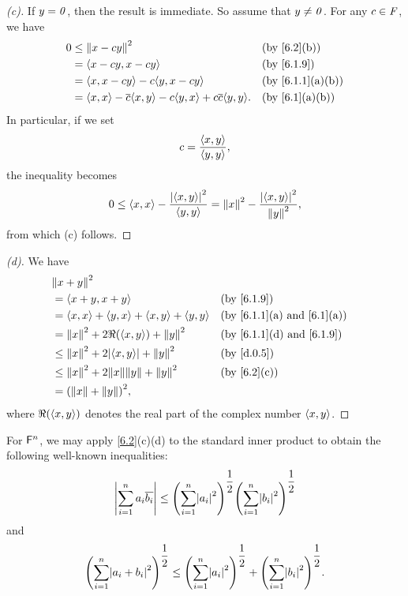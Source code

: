 \begin{proof}[(c)]
  If \(y = \mathit{0}\), then the result is immediate.
  So assume that \(y \neq \mathit{0}\).
  For any \(c \in \mathit{F}\), we have
  \begin{align*}
    0 & \leq \norm{x - cy}^2                                                       &  & \by{6.2}[b]     \\
      & = \inn{x - cy, x - cy}                                                     &  & \by{6.1.9}      \\
      & = \inn{x, x - cy} - c \inn{y, x - cy}                                      &  & \by{6.1.1}[a,b] \\
      & = \inn{x, x} - \conj{c} \inn{x, y} - c \inn{y, x} + c \conj{c} \inn{y, y}. &  & \by{6.1}[a,b]
  \end{align*}
  In particular, if we set
  \[
    c = \dfrac{\left\langle x, y\right\rangle}{\left\langle y, y\right\rangle},
  \]
  the inequality becomes
  \[
    0 \leq \left\langle x, x\right\rangle - \dfrac{\left\lvert\left\langle x, y\right\rangle\right\rvert^2}{\left\langle y, y\right\rangle} = \left\lVert x\right\rVert^2 - \dfrac{\left\lvert\left\langle x, y\right\rangle\right\rvert^2}{\left\lVert y\right\rVert^2},
  \]
  from which (c) follows.
\end{proof}

\begin{proof}[(d)]
  We have
  \begin{align*}
     & \norm{x + y}^2                                                                                         \\
     & = \inn{x + y, x + y}                                &  & \by{6.1.9}                                    \\
     & = \inn{x, x} + \inn{y, x} + \inn{x, y} + \inn{y, y} &  & \text{(by \cref{6.1.1}(a) and \cref{6.1}(a))} \\
     & = \norm{x}^2 + 2 \Re(\inn{x, y}) + \norm{y}^2       &  & \text{(by \cref{6.1.1}(d) and \cref{6.1.9})}  \\
     & \leq \norm{x}^2 + 2 \abs{\inn{x, y}} + \norm{y}^2   &  & \by{d.0.5}                                    \\
     & \leq \norm{x}^2 + 2 \norm{x} \norm{y} + \norm{y}^2  &  & \by{6.2}[c]                                   \\
     & = \pa{\norm{x} + \norm{y}}^2,
  \end{align*}
  where \(\Re(\left\langle x, y\right\rangle)\) denotes the real part of the complex number \(\left\langle x, y\right\rangle\).
\end{proof}

\begin{eg}\label{6.1.11}
  For \(\mathsf{F}^n\), we may apply \cref{6.2}(c)(d) to the standard inner product to obtain the following well-known inequalities:
  \[
    \abs{\sum_{i = 1}^n a_i \conj{b_i}} \leq \pa{\sum_{i = 1}^n \abs{a_i}^2}^{\dfrac{1}{2}} \pa{\sum_{i = 1}^n \abs{b_i}^2}^{\dfrac{1}{2}}
  \]
  and
  \[
    \pa{\sum_{i = 1}^n \abs{a_i + b_i}^2}^{\dfrac{1}{2}} \leq \pa{\sum_{i = 1}^n \abs{a_i}^2}^{\dfrac{1}{2}} + \pa{\sum_{i = 1}^n \abs{b_i}^2}^{\dfrac{1}{2}}.
  \]
\end{eg}

